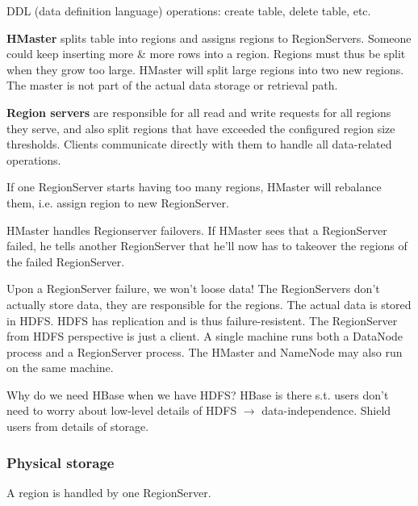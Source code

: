 \documentclass[11pt,oneside,a4paper]{article}
\begin{document}
\begin{compactitem}
	\item DDL (data definition language) operations: create table, delete table, etc.
	\item \textbf{HMaster} splits table into regions and assigns regions to RegionServers. Someone could keep inserting more \& more rows into a region. Regions must thus be split when they grow too large. HMaster will split large regions into two new regions. The master is not part of the actual data storage or retrieval path.
	\item \textbf{Region servers} are responsible for all read and write requests for all regions they serve, and also split regions that have exceeded the configured region size thresholds. Clients communicate directly with them to handle all data-related operations.
	\item If one RegionServer starts having too many regions, HMaster will rebalance them, i.e. assign region to new RegionServer.
	\item HMaster handles Regionserver failovers. If HMaster sees that a RegionServer failed, he tells another RegionServer that he'll now has to takeover the regions of the failed RegionServer.
	\item Upon a RegionServer failure, we won't loose data! The RegionServers don't actually store data, they are responsible for the regions. The actual data is stored in HDFS. HDFS has replication and is thus failure-resistent. The RegionServer from HDFS perspective is just a client. A single machine runs both a DataNode process and a RegionServer process. The HMaster and NameNode may also run on the same machine.\\
\end{compactitem}

Why do we need HBase when we have HDFS? HBase is there s.t. users don't need to worry about low-level details of HDFS $\rightarrow$ data-independence. Shield users from details of storage.

\subsubsection{Physical storage}

A region is handled by one RegionServer. 
\end{document}

